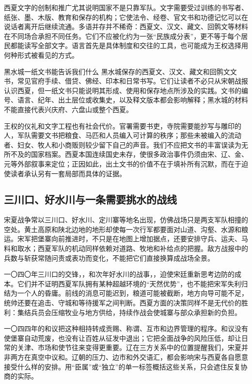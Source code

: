 西夏文字的创制和推广尤其说明国家不是只靠军队。文字需要受过训练的书写者、纸张、墨、木版、教育和保存的机构；它使法令、经卷、官文书和功德记忆可以在说话者离开后继续流通。多语并存并不稀奇：西夏文、汉文、藏文、回鹘文等材料在不同场合承担不同任务。它们不应被化约为一张“民族成分表”，更不等于每个居民都能读写全部文字。语言首先是具体制度和交往的工具，也可能成为王权选择用何种形式被看见的方式。

\begin{textwindow}{黑水城一纸文书能告诉我们什么}
黑水城保存的西夏文、汉文、藏文和回鹘文文书，常见官府手续、借贷、佛经、印本和日常书写。它们让读者不必只从宋朝战报认识西夏，但一纸文书只能说明其形成、使用和保存地点所涉及的实践。文书的编号、语言、纪年、出土层位或收集史，以及释文版本都会影响解释；黑水城的材料不能直接代表兴庆府、六盘山或整个西夏。
\end{textwindow}

王权的仪礼和文字工程也有社会代价。官署需要书吏，寺院需要能抄写与雕印的人，军队需要文书把粮食、马匹和人员编入可计算的秩序；那些未被编入的流动者、妇女、牧人和小商贩则较少留下自己的声音。我们不应把文书的丰富误读为无所不及的国家档案。西夏本国连续国史未存，使很多政治事件仍须由宋、辽、金、元等外部叙事来定位；正因如此，出土文书的价值不在于填补所有沉默，而在于迫使读者承认另有一套局部而具体的证据。

\subsection{三川口、好水川与一条需要挑水的战线}

宋夏战争常以三川口、好水川、定川寨等地名出现，仿佛战场只是两支军队相撞的空处。黄土高原和陕北边地的地形却使每一次行军都要面对山道、沟壑、水源和粮运。宋军把堡寨向前推进时，不只是在地图上增加据点，还要安排守兵、运夫、马料和取水；西夏军队的机动同样依赖对道路、牧地和补给点的把握。敌方战报中的兵数与斩获常随问责或表功而变化，不能把它们直接换算成战场全景。

一〇四〇年三川口的交锋，，和次年好水川的战事，，迫使宋廷重新思考边防的成本。它们并不证明西夏军队拥有某种超越环境的“天然优势”，也不能把宋军失利归结为一个人的昏庸。前线的消息可能迟到，粮道可能被截断，地方向导可能不足，统帅还要在追击、守城和等待援军之间判断。西夏方面的决策同样不是无代价的胜利：集结兵员会压缩牧业与地方供给，持续作战会使城寨与部众承担新的负担。

一〇四四年的和议把这种相持转成贡赐、称谓、互市和边界管理的程序。和议没有使堡寨自动荒废，也没有让百姓从征发中退出；它把全面战争的风险压低，却让日常的关津、市场和使节往来变得更重要。辽在三方关系中的位置提醒我们，宋夏并非两方在真空中议和。辽朝的压力、边市和外交语汇，都会影响宋与西夏各自愿意接受什么样的安排。用“臣属”或“独立”的单一标签概括这些关系，只会遮住反复协商的实际。

